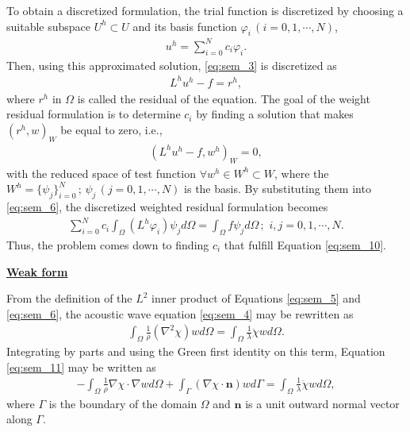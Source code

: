             To obtain a discretized formulation, the trial function is discretized by choosing a suitable subspace $U^h\subset U$ and its basis function $\varphi_i\, (i=0,1,\cdots,N)$,
            \begin{align} \label{eq:sem_7}
                u^h=\sum_{i=0}^Nc_i\varphi_i.
            \end{align}
            Then, using this approximated solution, \ref{eq:sem_3} is discretized as
            \begin{align} \label{eq:sem_8}
                L^hu^h-f=r^h,
            \end{align}
            where $r^h$ in $\Omega$ is called the residual of the equation. The goal of the weight residual
formulation is to determine $c_i$ by finding a solution that makes $(r^h,w)_W$ be equal to zero, i.e.,
            \begin{align} \label{eq:sem_9}
                (L^hu^h-f,w^h)_W=0,
            \end{align}
            with the reduced space of test function $\forall w^h\in W^h\subset W$, where the $W^h = \{ \psi_j\}_{i=0}^N\,;\,\psi_j\,(j=0,1,\cdots,N)$ is the basis.
By substituting them into \ref{eq:sem_6}, the discretized weighted residual formulation becomes
            \begin{align} \label{eq:sem_10}
                \sum_{i=0}^Nc_i\int_{\Omega}(L^h\varphi_i)\psi_jd\Omega=\int_{\Omega}f\psi_jd\Omega\,;\,\,i,j=0,1,\cdots,N.
            \end{align}
            Thus, the problem comes down to finding $c_i$ that fulfill Equation \ref{eq:sem_10}.

\noindent
        \underline{\textbf{Weak form}}

            From the definition of the $L^2$ inner product of Equations \ref{eq:sem_5} and \ref{eq:sem_6}, the acoustic wave equation \ref{eq:sem_4} may be
rewritten as
            \begin{align} \label{eq:sem_11}
                \int_{\Omega}\frac{1}{\rho}(\nabla^2\chi)wd\Omega=\int_\Omega\frac{1}{\lambda}\ddot{\chi}wd\Omega.
            \end{align}
            Integrating by parts and using the Green first identity on this term, Equation \ref{eq:sem_11} may be written as
            \begin{align} \label{eq:sem_12}
                -\int_{\Omega}\frac{1}{\rho}\nabla\chi\cdot\nabla wd\Omega + \int_\Gamma (\nabla\chi\cdot\bm{n})wd\Gamma
=\int_\Omega\frac{1}{\lambda}\ddot{\chi}wd\Omega,
            \end{align}
            where $\Gamma$ is the boundary of the domain $\Omega$ and $\bm{n}$ is a unit outward normal vector along $\Gamma$.

